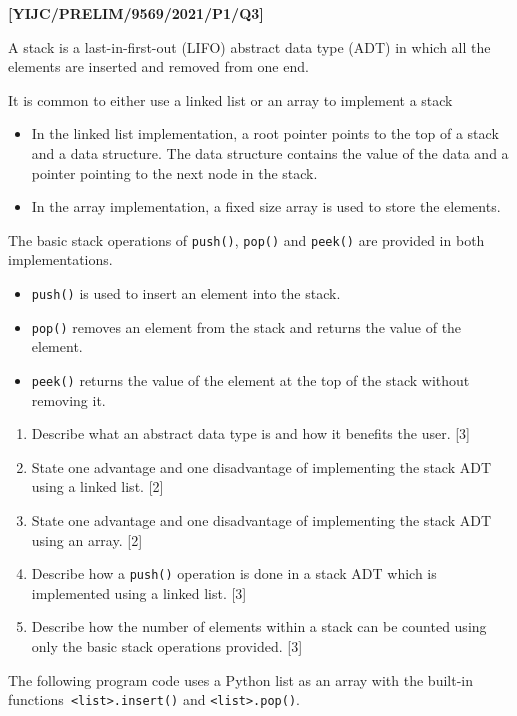 \item \textbf{{[}YIJC/PRELIM/9569/2021/P1/Q3{]} }

A stack is a last-in-first-out (LIFO) abstract data type (ADT) in
which all the elements are inserted and removed from one end. 

It is common to either use a linked list or an array to implement
a stack
\begin{itemize}
\item In the linked list implementation, a root pointer points to the top
of a stack and a data structure. The data structure contains the value
of the data and a pointer pointing to the next node in the stack. 
\item In the array implementation, a fixed size array is used to store the
elements. 
\end{itemize}
The basic stack operations of \texttt{push()}, \texttt{pop()} and
\texttt{peek()} are provided in both implementations. 
\begin{itemize}
\item \texttt{push()} is used to insert an element into the stack. 
\item \texttt{pop()} removes an element from the stack and returns the value
of the element. 
\item \texttt{peek()} returns the value of the element at the top of the
stack without removing it. 
\end{itemize}
\begin{enumerate}
\item Describe what an abstract data type is and how it benefits the user.\hfill{}
{[}3{]} 
\item State one advantage and one disadvantage of implementing the stack
ADT using a linked list. \hfill{}{[}2{]} 
\item State one advantage and one disadvantage of implementing the stack
ADT using an array.\hfill{} {[}2{]} 
\item Describe how a \texttt{push()} operation is done in a stack ADT which
is implemented using a linked list. \hfill{}{[}3{]} 
\item Describe how the number of elements within a stack can be counted
using only the basic stack operations provided. \hfill{}{[}3{]} 
\end{enumerate}
The following program code uses a Python list as an array with the
built-in functions\texttt{ <list>.insert()} and \texttt{<list>.pop()}. 

